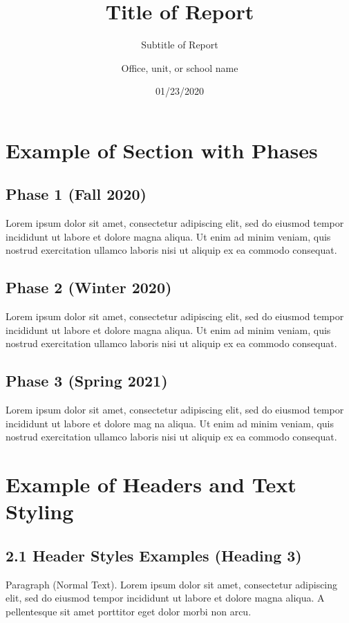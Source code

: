 \documentclass{nyu22report}
\title{Title of Report}
\subtitle{Subtitle of Report}
\author{Office, unit, or school name}
\date{01/23/2020}
\begin{document}
\maketitle

\tableofcontents

\chapter{Example of Section with Phases}

\section{Phase 1 (Fall 2020)}
Lorem ipsum dolor sit amet, consectetur adipiscing elit, sed do eiusmod tempor
incididunt ut labore et dolore magna aliqua. Ut enim ad minim veniam, quis
nostrud exercitation ullamco laboris nisi ut aliquip ex ea commodo consequat.

\section{Phase 2 (Winter 2020)}

Lorem ipsum dolor sit amet, consectetur adipiscing elit, sed do eiusmod tempor
incididunt ut labore et dolore magna aliqua. Ut enim ad minim veniam, quis
nostrud exercitation ullamco laboris nisi ut aliquip ex ea commodo consequat.

\section{Phase 3 (Spring 2021)}

Lorem ipsum dolor sit amet, consectetur adipiscing elit, sed do eiusmod tempor
incididunt ut labore et dolore mag  na aliqua. Ut enim ad minim veniam, quis
nostrud exercitation ullamco laboris nisi ut aliquip ex ea commodo consequat.


\chapter{Example of Headers and Text Styling}

\section{2.1 Header Styles Examples (Heading 3)}

Paragraph (Normal Text). Lorem ipsum dolor sit amet, consectetur adipiscing
elit, sed do eiusmod tempor incididunt ut labore et dolore magna aliqua. A
pellentesque sit amet porttitor eget dolor morbi non arcu.
\end{document}
